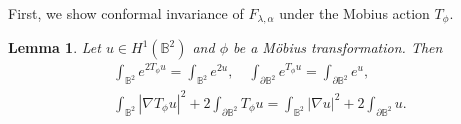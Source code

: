 \documentclass[11pt,a4paper,twoside]{amsart}
\newtheorem{lemma}[theorem]{Lemma}
\newtheorem{sketch proof}{Sketch of the proof}[section]
\begin{document}
    First, we show conformal invariance of  $F_{\lambda,\alpha}$ under the Mobius action $T_\phi$.
    \begin{lemma}\label{lem. conformal invariance of the functional}
        Let $u\in H^1(\mathbb{B}^2)$ and $\phi$ be a M\"obius transformation. Then
        \begin{align*}
            \int_{\mathbb{B}^2}e^{2T_\phi u}
        =\int_{\mathbb{B}^2} e^{2u},
        \quad
        \int_{\partial\mathbb{B}^2}e^{T_\phi u}
        =\int_{\partial\mathbb{B}^2} e^{u},\\
        \int_{\mathbb{B}^2}
        |\nabla T_\phi u|^2
        +2\int_{\partial\mathbb{B}^2}
        T_\phi u
        =\int_{\mathbb{B}^2} |\nabla u|^2
        +2\int_{\partial \mathbb{B}^2}u.
        \end{align*}
    \end{lemma}
\end{document}
